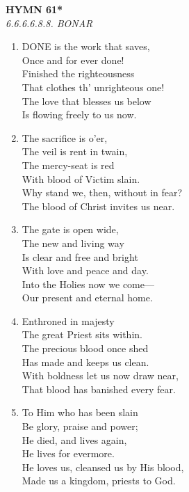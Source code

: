 \newpage
\begin{center}
    {\Large \textbf{HYMN 61*}}
    \\
    \textit{6.6.6.6.8.8. BONAR}
\end{center}
\vspace{1em}

\begin{enumerate}
    \item DONE is the work that saves, \\
        Once and for ever done! \\
        Finished the righteousness \\
        That clothes th' unrighteous one! \\
        The love that blesses us below \\
        Is flowing freely to us now.

    \item The sacrifice is o'er, \\
        The veil is rent in twain, \\
        The mercy-seat is red \\
        With blood of Victim slain. \\
        Why stand we, then, without in fear? \\
        The blood of Christ invites us near.

    \item The gate is open wide, \\
        The new and living way \\
        Is clear and free and bright \\
        With love and peace and day. \\
        Into the Holies now we come--- \\
        Our present and eternal home.

    \item Enthroned in majesty \\
        The great Priest sits within. \\
        The precious blood once shed \\
        Has made and keeps us clean. \\
        With boldness let us now draw near, \\
        That blood has banished every fear.

    \item To Him who has been slain \\
        Be glory, praise and power; \\
        He died, and lives again, \\
        He lives for evermore. \\
        He loves us, cleansed us by His blood, \\
        Made us a kingdom, priests to God.

\end{enumerate}

